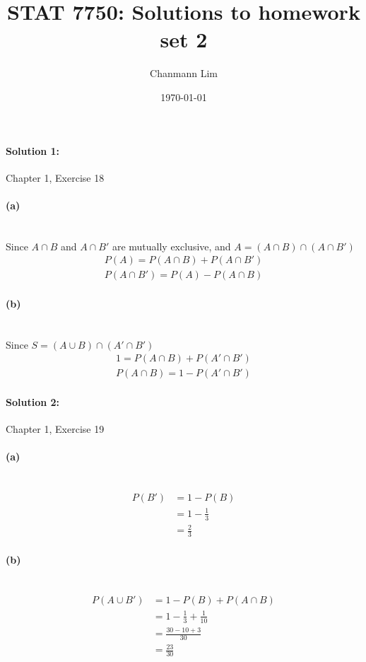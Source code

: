 \documentclass[a4paper]{article}
\begin{document}
\title{STAT 7750: Solutions to homework set 2}
\author{Chanmann Lim}
\date{\today}
\maketitle

\paragraph{Solution 1:}
Chapter 1, Exercise 18 

\paragraph{(a)} ~\\

\indent Since $A \cap B$ and $A \cap B'$ are mutually exclusive, and $A = (A \cap B) \cap (A \cap B')$ \\
\begin{align*}
P(A) = P(A \cap B) + P(A \cap B') \\
P(A \cap B') = P(A) - P(A \cap B)
\end{align*}

\paragraph{(b)} ~\\

\indent Since $S = (A \cup B) \cap (A' \cap B')$ \\
\begin{align*} 
1 = P(A \cap B) + P(A' \cap B') \\
P(A \cap B) = 1 - P(A' \cap B')
\end{align*}

\paragraph{Solution 2:}
Chapter 1, Exercise 19

\paragraph{(a)} ~\\
\begin{align*} 
P(B') &= 1 - P(B) \\
      &= 1 - \frac{1}{3} \\
      &= \frac{2}{3}
\end{align*}

\paragraph{(b)} ~\\
\begin{align*} 
P(A \cup B') &= 1 - P(B) + P(A \cap B) \\
             &= 1 - \frac{1}{3} + \frac{1}{10} \\
             &= \frac{30-10+3}{30} \\
             &= \frac{23}{30}
\end{align*}
\end{document}

